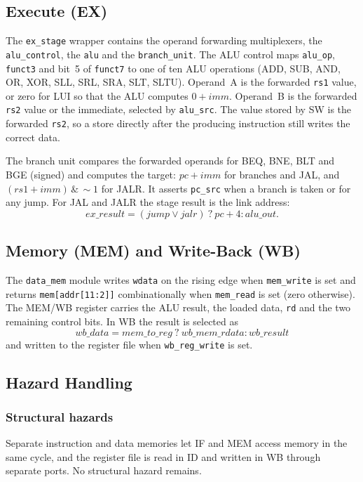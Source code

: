 \subsection{Execute (EX)}
The \texttt{ex\_stage} wrapper contains the operand forwarding multiplexers, the
\texttt{alu\_control}, the \texttt{alu} and the \texttt{branch\_unit}. The ALU control maps
\texttt{alu\_op}, \texttt{funct3} and bit~5 of \texttt{funct7} to one of ten ALU
operations (ADD, SUB, AND, OR, XOR, SLL, SRL, SRA, SLT, SLTU). Operand~A is the forwarded
\texttt{rs1} value, or zero for LUI so that the ALU computes $0 + imm$. Operand~B is the
forwarded \texttt{rs2} value or the immediate, selected by \texttt{alu\_src}. The value
stored by SW is the forwarded \texttt{rs2}, so a store directly after the producing
instruction still writes the correct data.

The branch unit compares the forwarded operands for BEQ, BNE, BLT and BGE (signed) and
computes the target: $pc + imm$ for branches and JAL, and $(rs1 + imm)\,\&\,\sim\!1$ for
JALR. It asserts \texttt{pc\_src} when a branch is taken or for any jump. For JAL and
JALR the stage result is the link address:
\begin{equation}
ex\_result = (jump \lor jalr)\ ?\ pc + 4 : alu\_out .
\end{equation}

\subsection{Memory (MEM) and Write-Back (WB)}
The \texttt{data\_mem} module writes \texttt{wdata} on the rising edge when
\texttt{mem\_write} is set and returns \texttt{mem[addr[11:2]]} combinationally when
\texttt{mem\_read} is set (zero otherwise). The MEM/WB register carries the ALU result,
the loaded data, \texttt{rd} and the two remaining control bits. In WB the result is
selected as
\begin{equation}
wb\_data = mem\_to\_reg\ ?\ wb\_mem\_rdata : wb\_result
\end{equation}
and written to the register file when \texttt{wb\_reg\_write} is set.

\subsection{Hazard Handling}

\subsubsection{Structural hazards}
Separate instruction and data memories let IF and MEM access memory in the same cycle,
and the register file is read in ID and written in WB through separate ports. No
structural hazard remains.

